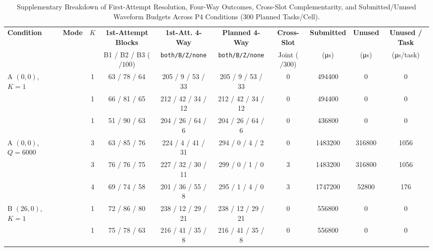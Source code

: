 \begin{table}[t]
\centering
\caption{Supplementary Breakdown of First-Attempt Resolution, Four-Way Outcomes, Cross-Slot Complementarity, and Submitted/Unused Waveform Budgets Across P4 Conditions ($300$ Planned Tasks/Cell).}
\label{tab:p4_supp}
\setlength{\tabcolsep}{4.0pt}
\scriptsize
\begin{tabular}{@{}llcccccccc@{}}
\toprule
\textbf{Condition} & \textbf{Mode} & $K$ & \textbf{1st-Attempt Blocks} & \textbf{1st-Att. 4-Way} & \textbf{Planned 4-Way} & \textbf{Cross-Slot} & \textbf{Submitted} & \textbf{Unused} & \textbf{Unused / Task} \\
 & & & B1 / B2 / B3 ($/100$) & \texttt{both/B/Z/none} & \texttt{both/B/Z/none} & Joint ($/300$) & (\si{\micro\second}) & (\si{\micro\second}) & (\si{\micro\second}/task) \\
\midrule
\multirow{3}{*}{A $(0,0)$, $K{=}1$}
  & \modejc{} & 1 & 63 / 78 / 64 & 205 / 9 / 53 / 33  & 205 / 9 / 53 / 33  & 0 & \num{494400}  & 0 & 0 \\
  & \modesc{} & 1 & 66 / 81 / 65 & 212 / 42 / 34 / 12 & 212 / 42 / 34 / 12 & 0 & \num{494400}  & 0 & 0 \\
  & \modelc{} & 1 & 51 / 90 / 63 & 204 / 26 / 64 / 6  & 204 / 26 / 64 / 6  & 0 & \num{436800}  & 0 & 0 \\
\midrule
\multirow{3}{*}{A $(0,0)$, $Q{=}6000$}
  & \modejc{} & 3 & 63 / 85 / 76 & 224 / 4 / 41 / 31  & 294 / 0 / 4 / 2 & 0 & \num{1483200} & \num{316800} & \num{1056} \\
  & \modesc{} & 3 & 76 / 76 / 75 & 227 / 32 / 30 / 11 & 299 / 0 / 1 / 0 & 3 & \num{1483200} & \num{316800} & \num{1056} \\
  & \modelc{} & 4 & 69 / 74 / 58 & 201 / 36 / 55 / 8  & 295 / 1 / 4 / 0 & 3 & \num{1747200} & \num{52800}  & \num{176}  \\
\midrule
\multirow{3}{*}{B $(26,0)$, $K{=}1$}
  & \modejc{} & 1 & 72 / 86 / 80 & 238 / 12 / 29 / 21 & 238 / 12 / 29 / 21 & 0 & \num{556800}  & 0 & 0 \\
  & \modesc{} & 1 & 75 / 78 / 63 & 216 / 41 / 35 / 8  & 216 / 41 / 35 / 8  & 0 & \num{556800}  & 0 & 0 \\

\end{tabular}
\end{table}

